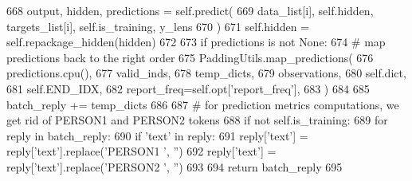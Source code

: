 \begin{DoxyCode}
668                 output, hidden, predictions = self.predict(
669                     data\_list[i], self.hidden, targets\_list[i], self.is\_training, y\_lens
670                 )
671                 self.hidden = self.repackage\_hidden(hidden)
672 
673                 \textcolor{keywordflow}{if} predictions \textcolor{keywordflow}{is} \textcolor{keywordflow}{not} \textcolor{keywordtype}{None}:
674                     \textcolor{comment}{# map predictions back to the right order}
675                     PaddingUtils.map\_predictions(
676                         predictions.cpu(),
677                         valid\_inds,
678                         temp\_dicts,
679                         observations,
680                         self.dict,
681                         self.END\_IDX,
682                         report\_freq=self.opt[\textcolor{stringliteral}{'report\_freq'}],
683                     )
684 
685             batch\_reply += temp\_dicts
686 
687         \textcolor{comment}{# for prediction metrics computations, we get rid of PERSON1 and PERSON2 tokens}
688         \textcolor{keywordflow}{if} \textcolor{keywordflow}{not} self.is\_training:
689             \textcolor{keywordflow}{for} reply \textcolor{keywordflow}{in} batch\_reply:
690                 \textcolor{keywordflow}{if} \textcolor{stringliteral}{'text'} \textcolor{keywordflow}{in} reply:
691                     reply[\textcolor{stringliteral}{'text'}] = reply[\textcolor{stringliteral}{'text'}].replace(\textcolor{stringliteral}{'PERSON1 '}, \textcolor{stringliteral}{''})
692                     reply[\textcolor{stringliteral}{'text'}] = reply[\textcolor{stringliteral}{'text'}].replace(\textcolor{stringliteral}{'PERSON2 '}, \textcolor{stringliteral}{''})
693 
694         \textcolor{keywordflow}{return} batch\_reply
695 
\end{DoxyCode}
\mbox{\label{classparlai_1_1agents_1_1language__model_1_1language__model_1_1LanguageModelAgent_a80bdd18c28f4a2ab19c463dd123165e7}} 
